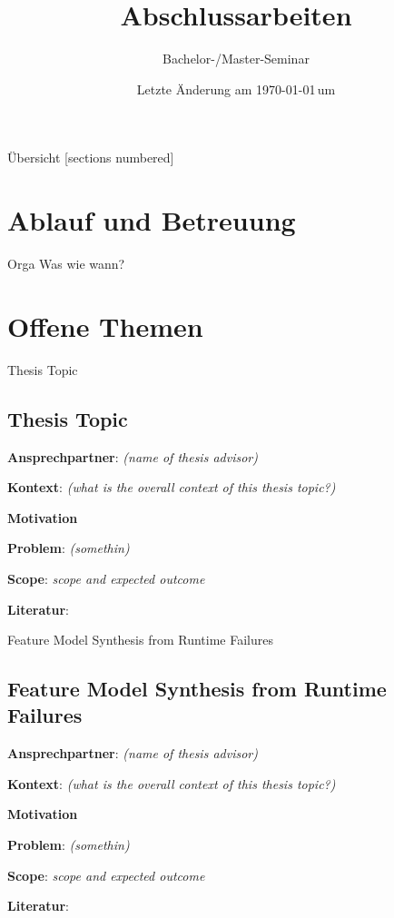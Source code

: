 \documentclass[aspectratio=169]{beamer}
\title[Abschlussarbeiten]{Abschlussarbeiten}
\subtitle[]{Bachelor-/Master-Seminar}
\author{}
\institute{}
\date{
	{\vfill \tiny Letzte Änderung am \today\,um \currenttime}
}
\begin{document}
\frame{
	\maketitle
}


\begin{frame}{Übersicht}
  [sections numbered]
  \tableofcontents%
\end{frame}

\section{Ablauf und Betreuung}
\begin{frame}{Orga}
	Was wie wann?
\end{frame}

\section{Offene Themen}


\begin{frame}[allowframebreaks]{Thesis Topic}
	\subsection{Thesis Topic}
	\textbf{Ansprechpartner}: \textit{(name of thesis advisor)}
	\begin{compactitem}
		\item \textbf{Kontext}: \textit{(what is the overall context of this thesis topic?)}
		\item \textbf{Motivation} 
		\item \textbf{Problem}: \textit{(somethin)}
		\item \textbf{Scope}: {\textit{scope and expected outcome}}
		\item \textbf{Literatur}: \cite{zeller2011failure,watling2021don} 
	\end{compactitem}
\end{frame}

\begin{frame}[allowframebreaks]{Feature Model Synthesis from Runtime Failures}
	\subsection{Feature Model Synthesis from Runtime Failures}
	\textbf{Ansprechpartner}: \textit{(name of thesis advisor)}
	\begin{compactitem}
		\item \textbf{Kontext}: \textit{(what is the overall context of this thesis topic?)}
		\item \textbf{Motivation} 
		\item \textbf{Problem}: \textit{(somethin)}
		\item \textbf{Scope}: {\textit{scope and expected outcome}}
		\item \textbf{Literatur}: \cite{zeller2011failure,watling2021don} 
	\end{compactitem}
\end{frame}
\end{document}
